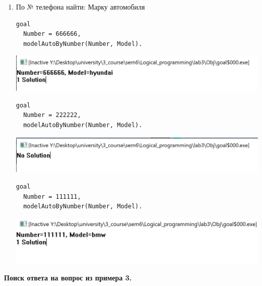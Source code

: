\documentclass[a4paper,14pt]{extreport} %
\begin{document}
\begin{enumerate}
\begin{enumerate}
\item По № телефона найти: Марку автомобиля

\begin{lstlisting}[caption=Пример 1 задание 1b]
goal
  Number = 666666,
  modelAutoByNumber(Number, Model).
\end{lstlisting}

\includegraphics[scale=0.8]{ex4}

\begin{lstlisting}[caption=Пример 2 задание 1b]
goal
  Number = 222222,
  modelAutoByNumber(Number, Model).
\end{lstlisting}

\includegraphics[scale=0.8]{ex5}

\begin{lstlisting}[caption=Пример 3 задание 1b]
goal
  Number = 111111,
  modelAutoByNumber(Number, Model).
\end{lstlisting}

\includegraphics[scale=0.8]{ex6}

\end{enumerate}

\textbf{Поиск ответа на вопрос из примера 3. }


\end{enumerate}
\end{document}

